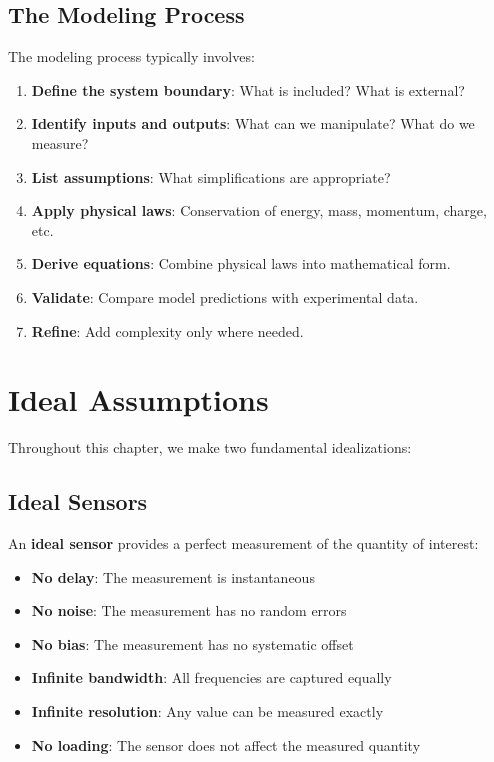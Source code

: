 \subsection{The Modeling Process}



The modeling process typically involves:

\begin{enumerate}
    \item \textbf{Define the system boundary}: What is included? What is external?

    \item \textbf{Identify inputs and outputs}: What can we manipulate? What do we measure?

    \item \textbf{List assumptions}: What simplifications are appropriate?

    \item \textbf{Apply physical laws}: Conservation of energy, mass, momentum, charge, etc.

    \item \textbf{Derive equations}: Combine physical laws into mathematical form.

    \item \textbf{Validate}: Compare model predictions with experimental data.

    \item \textbf{Refine}: Add complexity only where needed.
\end{enumerate}

\section{Ideal Assumptions}
\label{sec:ideal_assumptions}

Throughout this chapter, we make two fundamental idealizations:

\subsection{Ideal Sensors}

An \textbf{ideal sensor} provides a perfect measurement of the quantity of interest:

\begin{itemize}
    \item \textbf{No delay}: The measurement is instantaneous
    \item \textbf{No noise}: The measurement has no random errors
    \item \textbf{No bias}: The measurement has no systematic offset
    \item \textbf{Infinite bandwidth}: All frequencies are captured equally
    \item \textbf{Infinite resolution}: Any value can be measured exactly
    \item \textbf{No loading}: The sensor does not affect the measured quantity
\end{itemize}

